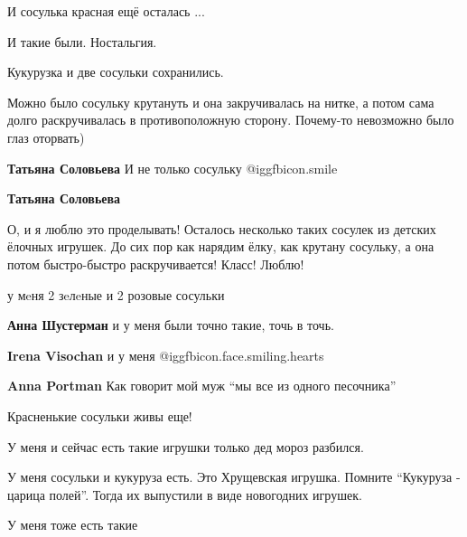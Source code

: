  
 
 
 
 

И сосулька красная ещё осталась ...

И такие были. Ностальгия.

Кукурузка и две сосульки сохранились.


Можно было сосульку крутануть и она закручивалась на нитке, а потом сама долго
раскручивалась в противоположную сторону. Почему-то невозможно было глаз
оторвать)


\textbf{Татьяна Соловьева} И не только сосульку  @igg{fbicon.smile} 

\textbf{Татьяна Соловьева}

О, и я люблю это проделывать! Осталось несколько таких сосулек из детских
ёлочных игрушек. До сих пор как нарядим ёлку, как крутану сосульку, а она потом
быстро-быстро раскручивается! Класс! Люблю!


у мeня 2 зeлeные и 2 розовые сосульки

\textbf{Анна Шустерман} и у меня были точно такие, точь в точь.

\textbf{Irena Visochan} и у меня  @igg{fbicon.face.smiling.hearts} 

\textbf{Anna Portman} Как говорит мой муж \enquote{мы все из одного песочника}

Красненькие сосульки живы еще!

У меня и сейчас есть такие игрушки только дед мороз разбился.


У меня сосульки и кукуруза есть. Это Хрущевская игрушка. Помните \enquote{Кукуруза -
царица полей}. Тогда их выпустили в виде новогодних игрушек.


У меня тоже есть такие

